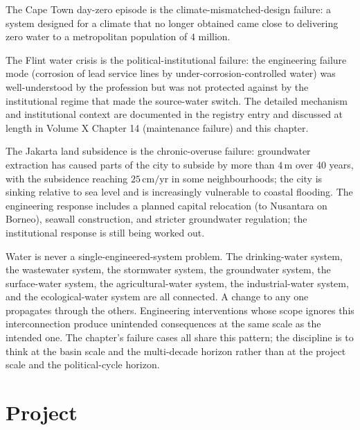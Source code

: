 The Cape Town day-zero episode \cite{acc:csir-capetown-2018} is the climate-mismatched-design failure: a system designed for a climate that no longer obtained came close to delivering zero water to a metropolitan population of $4$ million.

The Flint water crisis \cite{acc:fwatf-2016} is the political-institutional failure: the engineering failure mode (corrosion of lead service lines by under-corrosion-controlled water) was well-understood by the profession but was not protected against by the institutional regime that made the source-water switch. The detailed mechanism and institutional context are documented in the registry entry and discussed at length in Volume X Chapter 14 (maintenance failure) and this chapter.

The Jakarta land subsidence \cite{paper:abidin-jakarta-2011} is the chronic-overuse failure: groundwater extraction has caused parts of the city to subside by more than $4\,\text{m}$ over 40 years, with the subsidence reaching $25\,\text{cm/yr}$ in some neighbourhoods; the city is sinking relative to sea level and is increasingly vulnerable to coastal flooding. The engineering response includes a planned capital relocation (to Nusantara on Borneo), seawall construction, and stricter groundwater regulation; the institutional response is still being worked out.

\begin{principle}
Water is never a single-engineered-system problem. The drinking-water system, the wastewater system, the stormwater system, the groundwater system, the surface-water system, the agricultural-water system, the industrial-water system, and the ecological-water system are all connected. A change to any one propagates through the others. Engineering interventions whose scope ignores this interconnection produce unintended consequences at the same scale as the intended one. The chapter's failure cases all share this pattern; the discipline is to think at the basin scale and the multi-decade horizon rather than at the project scale and the political-cycle horizon.
\end{principle}

\section{Project}


